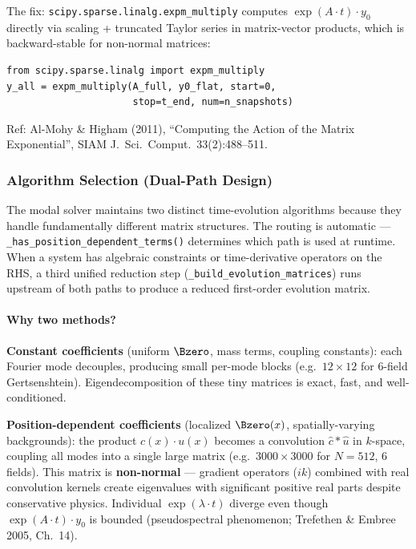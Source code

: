 The fix: \texttt{scipy.sparse.linalg.expm\_multiply} computes $\exp(A \cdot t) \cdot y_0$ directly via scaling + truncated Taylor series in matrix-vector products, which is backward-stable for non-normal matrices:

\begin{lstlisting}[style=python]
from scipy.sparse.linalg import expm_multiply
y_all = expm_multiply(A_full, y0_flat, start=0,
                      stop=t_end, num=n_snapshots)
\end{lstlisting}

Ref: Al-Mohy \& Higham (2011), ``Computing the Action of the Matrix Exponential'', SIAM J.\ Sci.\ Comput.\ 33(2):488--511.

\subsubsection{Algorithm Selection (Dual-Path Design)}
\label{sec:modal-algorithm-selection}

The modal solver maintains two distinct time-evolution algorithms because they handle fundamentally different matrix structures. The routing is automatic --- \texttt{\_has\_position\_dependent\_terms()} determines which path is used at runtime. When a system has algebraic constraints or time-derivative operators on the RHS, a third unified reduction step (\texttt{\_build\_evolution\_matrices}) runs upstream of both paths to produce a reduced first-order evolution matrix.

\paragraph{Why two methods?}
\label{par:modal-why-two}

\textbf{Constant coefficients} (uniform $\Bzero$, mass terms, coupling constants): each Fourier mode decouples, producing small per-mode blocks (e.g.\ $12\times 12$ for 6-field Gertsenshtein). Eigendecomposition of these tiny matrices is exact, fast, and well-conditioned.

\textbf{Position-dependent coefficients} (localized $\Bzero(x)$, spatially-varying backgrounds): the product $c(x) \cdot u(x)$ becomes a convolution $\hat{c} * \hat{u}$ in $k$-space, coupling all modes into a single large matrix (e.g.\ $3000\times 3000$ for $N=512$, 6 fields). This matrix is \textbf{non-normal} --- gradient operators ($ik$) combined with real convolution kernels create eigenvalues with significant positive real parts despite conservative physics. Individual $\exp(\lambda \cdot t)$ diverge even though $\exp(A \cdot t) \cdot y_0$ is bounded (pseudospectral phenomenon; Trefethen \& Embree 2005, Ch.\ 14).

